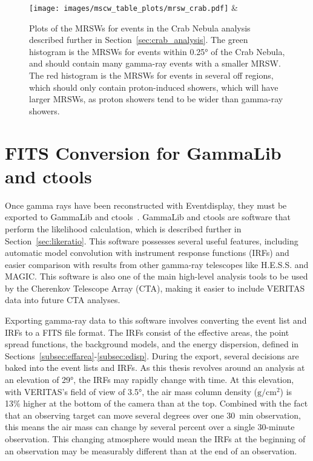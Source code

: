 \begin{figure}[th]
  \centering
  \texttt{[image: images/mscw\_table\_plots/mrsw\_crab.pdf]} &
  \caption[Crab Nebula Mean Reduced Scaled Width]{
    Plots of the MRSWs for events in the Crab Nebula analysis described further in Section~\ref{sec:crab_analysis}.
    The green histogram is the MRSWs for events within \ang{0.25} of the Crab Nebula, and should contain many gamma-ray events with a smaller MRSW.
    The red histogram is the MRSWs for events in several off regions, which should only contain proton-induced showers, which will have larger MRSWs, as proton showers tend to be wider than gamma-ray showers.
  }
  \label{fig:mscw_crab}
\end{figure}


\section{FITS Conversion for GammaLib and ctools}\label{fitsconversion}
Once gamma rays have been reconstructed with Eventdisplay, they must be exported to GammaLib and ctools~\cite{gammalibctools}.
GammaLib and ctools are software that perform the likelihood calculation, which is described further in Section~\ref{sec:likeratio}.
This software possesses several useful features, including automatic model convolution with instrument response functions (IRFs) and easier comparison with results from other gamma-ray telescopes like H.E.S.S. and MAGIC.
This software is also one of the main high-level analysis tools to be used by the Cherenkov Telescope Array (CTA), making it easier to include VERITAS data into future CTA analyses.

Exporting gamma-ray data to this software involves converting the event list and IRFs to a FITS file format.
The IRFs consist of the effective areas, the point spread functions, the background models, and the energy dispersion, defined in Sections~\ref{subsec:effarea}-\ref{subsec:edisp}.
During the export, several decisions are baked into the event lists and IRFs.
As this thesis revolves around an analysis at an elevation of \nicetilde{}\ang{29}, the IRFs may rapidly change with time.
At this elevation, with VERITAS's field of view of \ang{3.5}, the air mass column density ($\textrm{g}/\textrm{cm}^2$) is 13\% higher at the bottom of the camera than at the top.
Combined with the fact that an observing target can move several degrees over one \SI{30}{min} observation, this means the air mass can change by several percent over a single 30-minute observation.
This changing atmosphere would mean the IRFs at the beginning of an observation may be measurably different than at the end of an observation.

